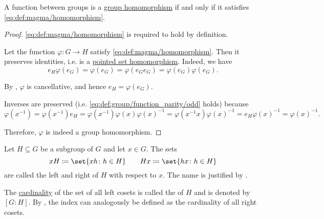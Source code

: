 \begin{proposition}\label{thm:group_homomorphism_single_condition}
  A function between groups is a \hyperref[def:group/homomorphism]{group homomorphism} if and only if it satisfies \eqref{eq:def:magma/homomorphism}.
\end{proposition}
\begin{proof}
  \SufficiencySubProof \eqref{eq:def:magma/homomorphism} is required to hold by definition.

  \NecessitySubProof Let the function \( \varphi: G \to H \) satisfy \eqref{eq:def:magma/homomorphism}. Then it preserves identities, i.e. is a \hyperref[def:pointed_set/homomorphism]{pointed set homomorphism}. Indeed, we have
  \begin{equation*}
    e_H \varphi(e_G) = \varphi(e_G) = \varphi(e_G e_G) = \varphi(e_G) \varphi(e_G).
  \end{equation*}

  By , \( \varphi \) is cancellative, and hence \( e_H = \varphi(e_G) \).

  Inverses are preserved (i.e. \eqref{eq:def:group/function_parity/odd} holds) because
  \begin{equation*}
    \varphi(x^{-1})
    =
    \varphi(x^{-1}) e_H
    =
    \varphi(x^{-1}) \varphi(x) \varphi(x)^{-1}
    =
    \varphi(x^{-1} x) \varphi(x)^{-1}
    =
    e_H \varphi(x)^{-1}
    =
    \varphi(x)^{-1}.
  \end{equation*}

  Therefore, \( \varphi \) is indeed a group homomorphism.
\end{proof}

\begin{definition}\label{def:group_cosets}
  Let \( H \subseteq G \) be a subgroup of \( G \) and let \( x \in G \). The sets
  \begin{equation*}
    x H \coloneqq \set{ xh \colon h \in H }
    \quad\quad
    H x \coloneqq \set{ hx \colon h \in H }
  \end{equation*}
  are called the left and right  of \( H \) with respect to \( x \). The name is justified by .

  The \hyperref[def:cardinal]{cardinality} of the set of all left cosets is called the  of \( H \) and is denoted by \( [G : H] \). By , the index can analogously be defined as the cardinality of all right cosets.
\end{definition}

